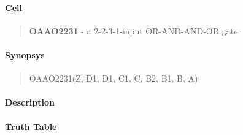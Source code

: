 \label{OAAO2231}
\paragraph{Cell}
\begin{quote}
    \textbf{OAAO2231} - a 2-2-3-1-input OR-AND-AND-OR gate
\end{quote}

\paragraph{Synopsys}
\begin{quote}
    OAAO2231(Z, D1, D1, C1, C, B2, B1, B, A)
\end{quote}

\paragraph{Description}

%

\paragraph{Truth Table}
%

